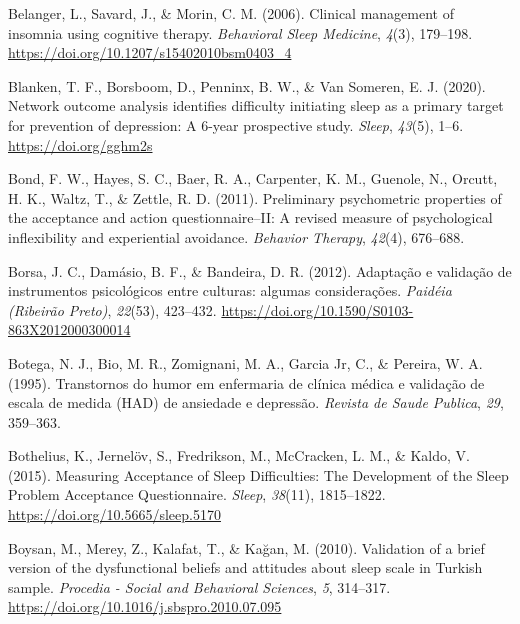 \documentclass[
  ,doc,11pt, twoside,floatsintext]{apa6}
\newlength{\cslhangindent}
\newlength{\cslentryspacingunit} %
\newenvironment{CSLReferences}[2] %
 {%
  \setlength{\parindent}{0pt}
  \ifodd #1
  \let\oldpar\par
  \def\par{\hangindent=\cslhangindent\oldpar}
  \fi
  \setlength{\parskip}{#2\cslentryspacingunit}
 }%
 {}
\begin{document}
\begin{CSLReferences}{1}{0}
\leavevmode{}%
Belanger, L., Savard, J., \& Morin, C. M. (2006). Clinical management of insomnia using cognitive therapy. \emph{Behavioral Sleep Medicine}, \emph{4}(3), 179--198. \url{https://doi.org/10.1207/s15402010bsm0403_4}

\leavevmode{}%
Blanken, T. F., Borsboom, D., Penninx, B. W., \& Van Someren, E. J. (2020). Network outcome analysis identifies difficulty initiating sleep as a primary target for prevention of depression: A 6-year prospective study. \emph{Sleep}, \emph{43}(5), 1--6. \url{https://doi.org/gghm2s}

\leavevmode{}%
Bond, F. W., Hayes, S. C., Baer, R. A., Carpenter, K. M., Guenole, N., Orcutt, H. K., Waltz, T., \& Zettle, R. D. (2011). Preliminary psychometric properties of the acceptance and action questionnaire--II: A revised measure of psychological inflexibility and experiential avoidance. \emph{Behavior Therapy}, \emph{42}(4), 676--688.

\leavevmode{}%
Borsa, J. C., Damásio, B. F., \& Bandeira, D. R. (2012). {Adaptação e validação de instrumentos psicológicos entre culturas: algumas considerações}. \emph{Paidéia (Ribeirão Preto)}, \emph{22}(53), 423--432. \url{https://doi.org/10.1590/S0103-863X2012000300014}

\leavevmode{}%
Botega, N. J., Bio, M. R., Zomignani, M. A., Garcia Jr, C., \& Pereira, W. A. (1995). Transtornos do humor em enfermaria de clínica médica e validação de escala de medida (HAD) de ansiedade e depressão. \emph{Revista de Saude Publica}, \emph{29}, 359--363.

\leavevmode{}%
Bothelius, K., Jernelöv, S., Fredrikson, M., McCracken, L. M., \& Kaldo, V. (2015). Measuring {Acceptance} of {Sleep Difficulties}: {The Development} of the {Sleep Problem Acceptance Questionnaire}. \emph{Sleep}, \emph{38}(11), 1815--1822. \url{https://doi.org/10.5665/sleep.5170}

\leavevmode{}%
Boysan, M., Merey, Z., Kalafat, T., \& Kağan, M. (2010). Validation of a brief version of the dysfunctional beliefs and attitudes about sleep scale in {Turkish} sample. \emph{Procedia - Social and Behavioral Sciences}, \emph{5}, 314--317. \url{https://doi.org/10.1016/j.sbspro.2010.07.095}


\end{CSLReferences}
\end{document}

